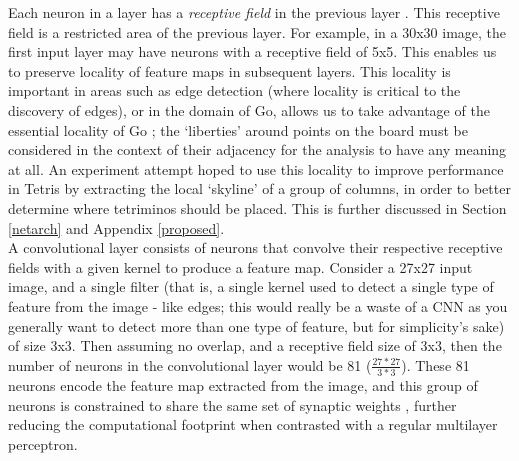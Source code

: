\documentclass[12pt]{article}
\begin{document}
Each neuron in a layer has a \textit{receptive field} in the previous layer \autocite{haykin2010neural}. This receptive field is a restricted area of the previous layer. For example, in a 30x30 image, the first input layer may have neurons with a receptive field of 5x5. This enables us to preserve locality of feature maps in subsequent layers. This locality is important in areas such as edge detection (where locality is critical to the discovery of edges), or in the domain of Go, allows us to take advantage of the essential locality of Go \autocite{AlphaZero}; the `liberties' around points on the board must be considered in the context of their adjacency for the analysis to have any meaning at all. An experiment attempt hoped to use this locality to improve performance in Tetris by extracting the local `skyline' of a group of columns, in order to better determine where tetriminos should be placed. This is further discussed in Section \ref{netarch} and Appendix \ref{proposed}.\\\newline
A convolutional layer consists of neurons that convolve their respective receptive fields with a given kernel to produce a feature map. Consider a 27x27 input image, and a single filter (that is, a single kernel used to detect a single type of feature from the image - like edges; this would really be a waste of a CNN as you generally want to detect more than one type of feature, but for simplicity's sake) of size 3x3. Then assuming no overlap, and a receptive field size of 3x3, then the number of neurons in the convolutional layer would be 81 ($\frac{27*27}{3*3}$). These 81 neurons encode the feature map extracted from the image, and this group of neurons is constrained to share the same set of synaptic weights \autocite{haykin2010neural}, further reducing the computational footprint when contrasted with a regular multilayer perceptron.\\\newline
\end{document}
